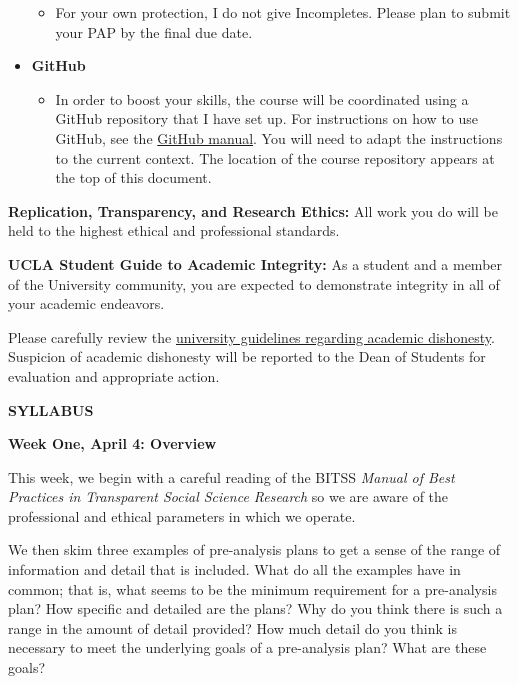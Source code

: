 \documentclass[11pt]{article}
\begin{document}
\begin{itemize}
\begin{itemize}
			\item For your own protection, I do not give Incompletes. Please plan to submit your PAP by the final due date.
			\end{itemize}
			\item \textbf{GitHub}
			\begin{itemize}
			\item In order to boost your skills, the course will be coordinated using a GitHub repository that I have set up. For instructions on how to use GitHub, see the \href{https://docs.wixstatic.com/ugd/02c1bf_98ecb1e8230249c3bae7f56b6b68bc63.pdf}{GitHub manual}. You will need to adapt the instructions to the current context. The location of the course repository appears at the top of this document. 
\end{itemize}
\end{itemize}

\textbf {\large Replication, Transparency, and Research Ethics:} All work you do will be held to the highest ethical and professional standards. 


\textbf {\large UCLA Student Guide to Academic Integrity:} As a student and a member of the University community,
you are expected to demonstrate integrity in all of your academic
endeavors. 

Please carefully review the \href{http://www.deanofstudents.ucla.edu/Portals/16/Documents/StudentGuide.pdf}{university guidelines regarding academic dishonesty}. 
Suspicion of academic dishonesty will be reported to the Dean of Students for evaluation and appropriate action.


\newpage
\centerline{\textbf{SYLLABUS}}


\textbf{Week One, April 4: Overview}

This week, we begin with a careful reading of the BITSS \emph{Manual of Best Practices in Transparent Social Science Research} so we
are aware of the professional and ethical parameters in which we operate.  


We then skim three examples of pre-analysis plans to get a sense of the range of information and detail that is included. What do all the examples have in common; that is, what seems to be the minimum requirement for a
pre-analysis plan? How specific and detailed are the 
plans? Why do you think there is such a range in the amount of detail provided? How much detail do you think is
necessary to meet the underlying goals of a pre-analysis plan? What are these goals?
\end{document}
